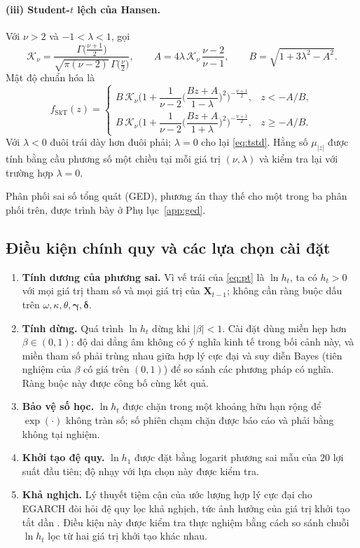 \documentclass[12pt,a4paper]{article}
\theoremstyle{definition}
\theoremstyle{remark}
\newcommand{\bgamma}{\boldsymbol{\gamma}}
\newcommand{\bdelta}{\boldsymbol{\delta}}
\newcommand{\bX}{\mathbf{X}}
\begin{document}
\paragraph{(iii) Student-$t$ lệch của Hansen.} Với $\nu>2$ và $-1<\lambda<1$, gọi
\begin{equation}
\mathcal K_\nu=\frac{\Gamma\!\big(\frac{\nu+1}{2}\big)}{\sqrt{\pi(\nu-2)}\,\Gamma\!\big(\frac{\nu}{2}\big)},\qquad
A=4\lambda\,\mathcal K_\nu\,\frac{\nu-2}{\nu-1},\qquad
B=\sqrt{1+3\lambda^2-A^2}.
\end{equation}
Mật độ chuẩn hóa là \cite{hansen1994}
\begin{equation}\label{eq:skt}
f_{\mathrm{SkT}}(z)=
\begin{cases}
B\,\mathcal K_\nu\Big(1+\dfrac{1}{\nu-2}\Big(\dfrac{Bz+A}{1-\lambda}\Big)^2\Big)^{-\frac{\nu+1}{2}}, & z<-A/B,\\[10pt]
B\,\mathcal K_\nu\Big(1+\dfrac{1}{\nu-2}\Big(\dfrac{Bz+A}{1+\lambda}\Big)^2\Big)^{-\frac{\nu+1}{2}}, & z\ge -A/B.
\end{cases}
\end{equation}
Với $\lambda<0$ đuôi trái dày hơn đuôi phải; $\lambda=0$ cho lại \eqref{eq:tstd}. Hằng số $\mu_{|z|}$ được tính bằng cầu phương số một chiều tại mỗi giá trị $(\nu,\lambda)$ và kiểm tra lại với trường hợp $\lambda=0$.

Phân phối sai số tổng quát (GED), phương án thay thế cho một trong ba phân phối trên, được trình bày ở Phụ lục~\ref{app:ged}.

\subsection{Điều kiện chính quy và các lựa chọn cài đặt}

\begin{enumerate}
\item \textbf{Tính dương của phương sai.} Vì vế trái của \eqref{eq:pt} là $\ln h_t$, ta có $h_t>0$ với mọi giá trị tham số và mọi giá trị của $\bX_{t-1}$; không cần ràng buộc dấu trên $\omega,\kappa,\theta,\bgamma,\bdelta$.
\item \textbf{Tính dừng.} Quá trình $\ln h_t$ dừng khi $|\beta|<1$. Cài đặt dùng miền hẹp hơn $\beta\in(0,1)$: độ dai dẳng âm không có ý nghĩa kinh tế trong bối cảnh này, và miền tham số phải trùng nhau giữa hợp lý cực đại và suy diễn Bayes (tiên nghiệm của $\beta$ có giá trên $(0,1)$) để so sánh các phương pháp có nghĩa. Ràng buộc này được công bố cùng kết quả.
\item \textbf{Bảo vệ số học.} $\ln h_t$ được chặn trong một khoảng hữu hạn rộng để $\exp(\cdot)$ không tràn số; số phiên chạm chặn được báo cáo và phải bằng không tại nghiệm.
\item \textbf{Khởi tạo đệ quy.} $\ln h_1$ được đặt bằng logarit phương sai mẫu của $20$ lợi suất đầu tiên; độ nhạy với lựa chọn này được kiểm tra.
\item \textbf{Khả nghịch.} Lý thuyết tiệm cận của ước lượng hợp lý cực đại cho EGARCH đòi hỏi đệ quy lọc khả nghịch, tức ảnh hưởng của giá trị khởi tạo tắt dần \cite{straumann2006}. Điều kiện này được kiểm tra thực nghiệm bằng cách so sánh chuỗi $\ln h_t$ lọc từ hai giá trị khởi tạo khác nhau.
\end{enumerate}
\end{document}
